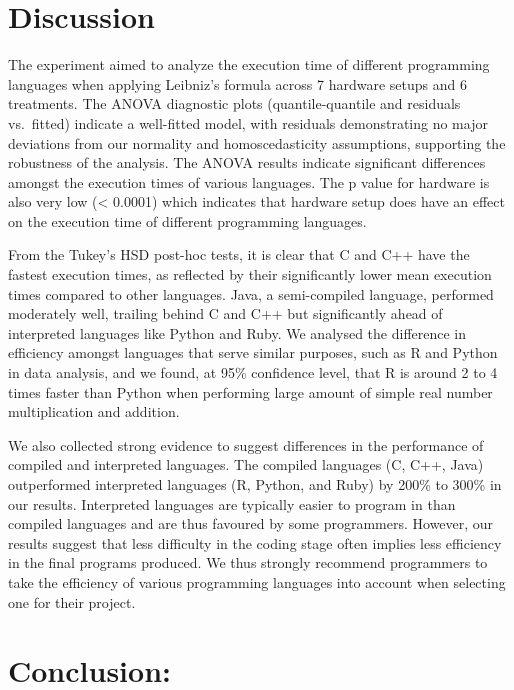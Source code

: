 \documentclass[12pt,halfline,a4paper,]{ouparticle}
\begin{document}
\section{Discussion}\label{discussion}

The experiment aimed to analyze the execution time of different
programming languages when applying Leibniz's formula across 7 hardware
setups and 6 treatments. The ANOVA diagnostic plots (quantile-quantile
and residuals vs.~fitted) indicate a well-fitted model, with residuals
demonstrating no major deviations from our normality and
homoscedasticity assumptions, supporting the robustness of the analysis.
The ANOVA results indicate significant differences amongst the execution
times of various languages. The p value for hardware is also very low
(\textless{} 0.0001) which indicates that hardware setup does have an
effect on the execution time of different programming languages.

From the Tukey's HSD post-hoc tests, it is clear that C and C++ have the
fastest execution times, as reflected by their significantly lower mean
execution times compared to other languages. Java, a semi-compiled
language, performed moderately well, trailing behind C and C++ but
significantly ahead of interpreted languages like Python and Ruby. We
analysed the difference in efficiency amongst languages that serve
similar purposes, such as R and Python in data analysis, and we found,
at 95\% confidence level, that R is around 2 to 4 times faster than
Python when performing large amount of simple real number multiplication
and addition.

We also collected strong evidence to suggest differences in the
performance of compiled and interpreted languages. The compiled
languages (C, C++, Java) outperformed interpreted languages (R, Python,
and Ruby) by 200\% to 300\% in our results. Interpreted languages are
typically easier to program in than compiled languages and are thus
favoured by some programmers. However, our results suggest that less
difficulty in the coding stage often implies less efficiency in the
final programs produced. We thus strongly recommend programmers to take
the efficiency of various programming languages into account when
selecting one for their project.

\section{Conclusion:}\label{conclusion}
\end{document}
